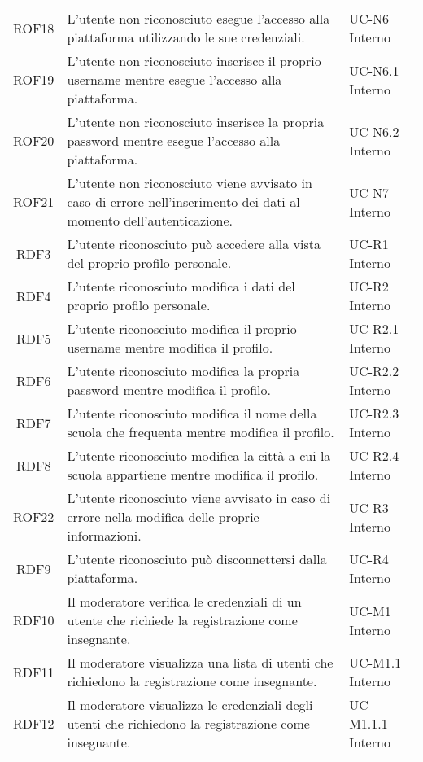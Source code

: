 \begin{tabularx}{\textwidth}{| c | p{10cm} | X |}
		ROF18 & L'utente non riconosciuto esegue l'accesso alla piattaforma utilizzando le sue credenziali. & UC-N6 \newline Interno\\
		ROF19 & L'utente non riconosciuto inserisce il proprio username mentre esegue l'accesso alla piattaforma. & UC-N6.1 \newline Interno\\
		ROF20 & L'utente non riconosciuto inserisce la propria password mentre esegue l'accesso alla piattaforma. & UC-N6.2 \newline Interno\\
		ROF21 & L'utente non riconosciuto viene avvisato in caso di errore nell'inserimento dei dati al momento dell'autenticazione. & UC-N7 \newline Interno\\

		RDF3 & L'utente riconosciuto può accedere alla vista del proprio profilo personale. & UC-R1 \newline Interno\\
		RDF4 & L'utente riconosciuto modifica i dati del proprio profilo personale. & UC-R2 \newline Interno\\
		RDF5 & L'utente riconosciuto modifica il proprio username mentre modifica il profilo. & UC-R2.1 \newline Interno\\
		RDF6 & L'utente riconosciuto modifica la propria password mentre modifica il profilo. & UC-R2.2 \newline Interno\\
		RDF7 & L'utente riconosciuto modifica il nome della scuola che frequenta mentre modifica il profilo. & UC-R2.3 \newline Interno\\
		RDF8 & L'utente riconosciuto modifica la città a cui la scuola appartiene mentre modifica il profilo. & UC-R2.4 \newline Interno\\
		ROF22 & L'utente riconosciuto viene avvisato in caso di errore nella modifica delle proprie informazioni. & UC-R3 \newline Interno\\	
		RDF9 & L'utente riconosciuto può disconnettersi dalla piattaforma. & UC-R4 \newline Interno\\	
		
		RDF10 & Il moderatore verifica le credenziali di un utente che richiede la registrazione come insegnante. & UC-M1 \newline Interno\\
		RDF11 & Il moderatore visualizza una lista di utenti che richiedono la registrazione come insegnante. & UC-M1.1 \newline Interno\\
		RDF12 & Il moderatore visualizza le credenziali degli utenti che richiedono la registrazione come insegnante. & UC-M1.1.1 \newline Interno\\


\end{tabularx}
